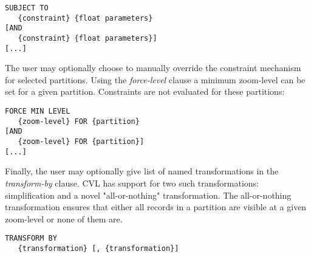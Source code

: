 \begin{lstlisting}
SUBJECT TO 
   {constraint} {float parameters} 
[AND
   {constraint} {float parameters}]
[...]
\end{lstlisting}

The user may optionally choose to manually override the constraint mechanism for selected partitions. Using the \emph{force-level} clause a minimum zoom-level can be set for a given partition. Constraints are not evaluated for these partitions:

\begin{lstlisting}
FORCE MIN LEVEL
   {zoom-level} FOR {partition}
[AND
   {zoom-level} FOR {partition}]
[...]
\end{lstlisting}

Finally, the user may optionally give list of named transformations in the \emph{transform-by} clause. CVL has support for two such transformations: simplification and a novel "all-or-nothing" transformation. The all-or-nothing transformation ensures that either all records in a partition are visible at a given zoom-level or none of them are.

\begin{lstlisting}
TRANSFORM BY
   {transformation} [, {transformation}]
\end{lstlisting}


